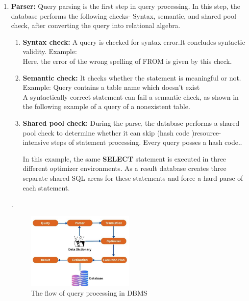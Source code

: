 \begin{enumerate}
\item \textbf{Parser:} Query parsing is the first step in query processing. In this step, the database performs the following checks- Syntax, semantic, and shared pool check, after converting the query into relational algebra.\cite{wwwnaukricom-no-date}
    \begin{enumerate}
        \item \textbf{Syntax check:} A query is checked for syntax error.It concludes syntactic validity. Example:\\
        
          Here, the error of the wrong spelling of FROM is given by this check.
        \item \textbf{Semantic check:} It checks whether the statement is meaningful or not. Example: Query contains a table name which doesn't exist\\
        
        A syntactically correct statement can fail a semantic check, as shown in the following example of a query of a nonexistent table.\cite{Oracle}
        \item \textbf{Shared pool check:} During the parse, the database performs a shared pool check to determine whether it can skip (hash code )resource-intensive steps of statement processing. Every query posses a hash code..
        
        In this example, the same \textbf{SELECT} statement is executed in three different optimizer environments. As a result database creates three separate shared SQL areas for these statements and force a hard parse of each statement.\cite{Oracle}
    \end{enumerate}.\\
\begin{figure}[h]
    \centering
    \includegraphics[width=0.5\textwidth]{Figure/Query processing.jpg}
    \caption{The flow of query processing in DBMS}
    \label{fig:my_image}
\end{figure}
    

\end{enumerate}
